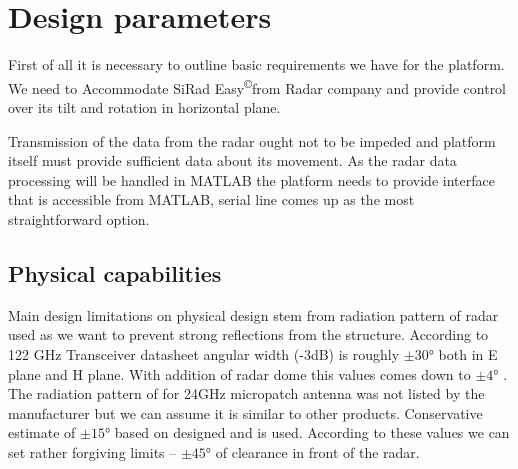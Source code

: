 
\def\PageLayout{single-no-print}
\def\DocLanguage{en}
\def\PackagesIncludeTikz{yes}
\def\PackagesIncludeBib{yes}








\newcommand{\sidar}{SiRad Easy\textsuperscript{\copyright}}







\tableofcontents

\newpage
{}
\setcounter{page}{1}


\pagestyle{fancy}


\chapter{Design parameters}

First of all it is necessary to outline basic requirements we have for the platform. We need to Accommodate \sidar from Radar company and provide control over its tilt and rotation in horizontal plane.

Transmission of the data from the radar ought not to be impeded and platform itself must provide sufficient data about its movement. As the radar data processing will be handled in MATLAB the platform needs to provide interface that is accessible from MATLAB, serial line comes up as the most straightforward option.

\section{Physical capabilities}

Main design limitations on physical design stem from radiation pattern of radar used as we want to prevent strong reflections from the structure.
According to 122 GHz Transceiver datasheet angular width (-3dB) is roughly $\pm30\text{°}$\cite{sidarTRX} both in E plane and H plane.
With addition of radar dome this values comes down to $\pm4\text{°}$ \cite{sidarMAN}.
The radiation pattern of for 24GHz micropatch antenna was not listed by the manufacturer but we can assume it is similar to other products.
Conservative estimate of $\pm15\text{°}$ based on designed \cite{patch1} and \cite{patch2} is used.
According to these values we can set rather forgiving limits -- $\pm45\text{°}$ of clearance in front of the radar.


